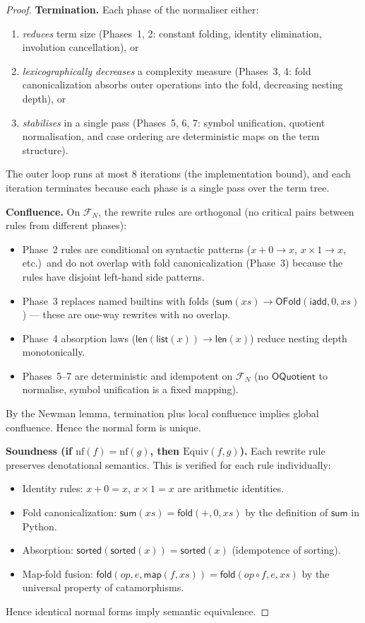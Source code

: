 \begin{proof}
\textbf{Termination.}
Each phase of the normaliser either:
\begin{enumerate}[label=(\alph*)]
  \item \emph{reduces} term size (Phases~1, 2: constant folding,
    identity elimination, involution cancellation), or
  \item \emph{lexicographically decreases} a complexity measure
    (Phases~3, 4: fold canonicalization absorbs outer operations
    into the fold, decreasing nesting depth), or
  \item \emph{stabilises} in a single pass (Phases~5, 6, 7: symbol
    unification, quotient normalisation, and case ordering are
    deterministic maps on the term structure).
\end{enumerate}
The outer loop runs at most 8 iterations (the implementation bound),
and each iteration terminates because each phase is a single
pass over the term tree.

\textbf{Confluence.}
On $\mathcal{F}_N$, the rewrite rules are orthogonal (no critical
pairs between rules from different phases):
\begin{itemize}
  \item Phase~2 rules are conditional on syntactic patterns
    ($x + 0 \to x$, $x \times 1 \to x$, etc.)\ and do not overlap
    with fold canonicalization (Phase~3) because the rules have
    disjoint left-hand side patterns.
  \item Phase~3 replaces named builtins with folds ($\mathsf{sum}(xs)
    \to \mathsf{OFold}(\mathsf{iadd}, 0, xs)$) — these are one-way
    rewrites with no overlap.
  \item Phase~4 absorption laws ($\mathsf{len}(\mathsf{list}(x))
    \to \mathsf{len}(x)$) reduce nesting depth monotonically.
  \item Phases~5--7 are deterministic and idempotent on
    $\mathcal{F}_N$ (no $\mathsf{OQuotient}$ to normalise, symbol
    unification is a fixed mapping).
\end{itemize}
By the Newman lemma, termination plus local confluence implies
global confluence.  Hence the normal form is unique.

\textbf{Soundness (if $\mathrm{nf}(f) = \mathrm{nf}(g)$, then
$\mathrm{Equiv}(f,g)$).}
Each rewrite rule preserves denotational semantics.  This is verified
for each rule individually:
\begin{itemize}
  \item Identity rules: $x + 0 = x$, $x \times 1 = x$ are
    arithmetic identities.
  \item Fold canonicalization: $\mathsf{sum}(xs) = \mathsf{fold}(+, 0, xs)$
    by the definition of $\mathsf{sum}$ in Python.
  \item Absorption: $\mathsf{sorted}(\mathsf{sorted}(x)) =
    \mathsf{sorted}(x)$ (idempotence of sorting).
  \item Map-fold fusion: $\mathsf{fold}(op, e, \mathsf{map}(f, xs))
    = \mathsf{fold}(op \circ f, e, xs)$ by the universal property
    of catamorphisms.
\end{itemize}
Hence identical normal forms imply semantic equivalence.


\end{proof}
